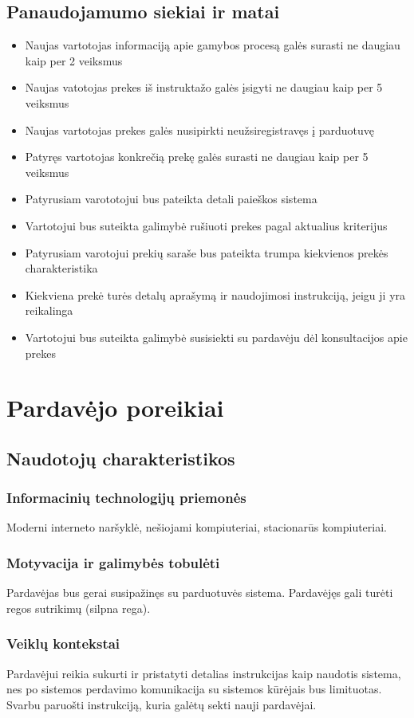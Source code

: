\documentclass[oneside]{VUMIFPSkursinis}
\begin{document}
	\subsection{Panaudojamumo siekiai ir matai}
		\begin{itemize}
			\item{Naujas vartotojas informaciją apie gamybos procesą galės surasti ne daugiau kaip per 2 veiksmus}
			\item{Naujas vatotojas prekes iš instruktažo galės įsigyti ne daugiau kaip per 5 veiksmus}
			\item{Naujas vartotojas prekes galės nusipirkti neužsiregistravęs į parduotuvę}
			\item{Patyręs vartotojas konkrečią prekę galės surasti ne daugiau kaip per 5 veiksmus}
			\item{Patyrusiam varototojui bus pateikta detali paieškos sistema}
			\item{Vartotojui bus suteikta galimybė rušiuoti prekes pagal aktualius kriterijus}
			\item{Patyrusiam varotojui prekių saraše bus pateikta trumpa kiekvienos prekės charakteristika}
			\item{Kiekviena prekė turės detalų aprašymą ir naudojimosi instrukciją, jeigu ji yra reikalinga}
			\item{Vartotojui bus suteikta galimybė susisiekti su pardavėju dėl konsultacijos apie prekes}
		\end{itemize}

\section{Pardavėjo poreikiai}
	\subsection{Naudotojų charakteristikos}
		\subsubsection{Informacinių technologijų priemonės}
			Moderni interneto naršyklė, nešiojami kompiuteriai, stacionarūs kompiuteriai.
		\subsubsection{Motyvacija ir galimybės tobulėti}
			Pardavėjas bus gerai susipažinęs su parduotuvės sistema. Pardavėjęs gali turėti regos sutrikimų (silpna rega).
		\subsubsection{Veiklų kontekstai}
			Pardavėjui reikia sukurti ir pristatyti detalias instrukcijas kaip naudotis sistema, nes po sistemos perdavimo komunikacija su sistemos kūrėjais bus limituotas. Svarbu paruošti instrukciją, kuria galėtų sekti nauji pardavėjai.
\end{document}
